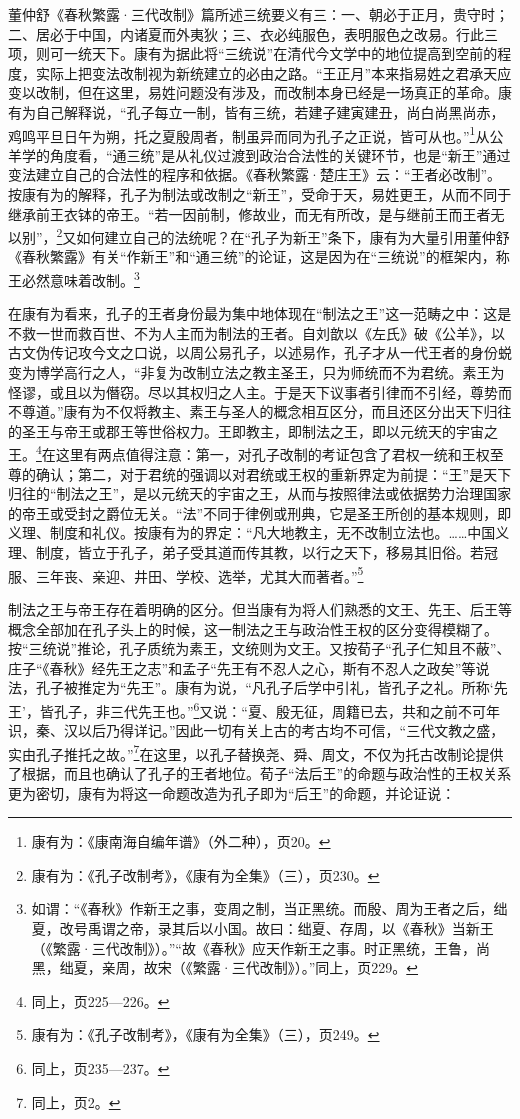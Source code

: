 \documentclass[a4paper, 12pt, openright]{ctexbook}
\begin{document}
董仲舒《春秋繁露·三代改制》篇所述三统要义有三：一、朝必于正月，贵守时；二、居必于中国，内诸夏而外夷狄；三、衣必纯服色，表明服色之改易。行此三项，则可一统天下。康有为据此将“三统说”在清代今文学中的地位提高到空前的程度，实际上把变法改制视为新统建立的必由之路。“王正月”本来指易姓之君承天应变以改制，但在这里，易姓问题没有涉及，而改制本身已经是一场真正的革命。康有为自己解释说，“孔子每立一制，皆有三统，若建子建寅建丑，尚白尚黑尚赤，鸡鸣平旦日午为朔，托之夏殷周者，制虽异而同为孔子之正说，皆可从也。”\footnote{康有为：《康南海自编年谱》（外二种），页20。}从公羊学的角度看，“通三统”是从礼仪过渡到政治合法性的关键环节，也是“新王”通过变法建立自己的合法性的程序和依据。《春秋繁露·楚庄王》云：“王者必改制”。按康有为的解释，孔子为制法或改制之“新王”，受命于天，易姓更王，从而不同于继承前王衣钵的帝王。“若一因前制，修故业，而无有所改，是与继前王而王者无以别”，\footnote{康有为：《孔子改制考》，《康有为全集》（三），页230。}又如何建立自己的法统呢？在“孔子为新王”条下，康有为大量引用董仲舒《春秋繁露》有关“作新王”和“通三统”的论证，这是因为在“三统说”的框架内，称王必然意味着改制。\footnote{如谓：“《春秋》作新王之事，变周之制，当正黑统。而殷、周为王者之后，绌夏，改号禹谓之帝，录其后以小国。故曰：绌夏、存周，以《春秋》当新王（《繁露·三代改制》）。”“故《春秋》应天作新王之事。时正黑统，王鲁，尚黑，绌夏，亲周，故宋（《繁露·三代改制》）。”同上，页229。}

在康有为看来，孔子的王者身份最为集中地体现在“制法之王”这一范畴之中：这是不救一世而救百世、不为人主而为制法的王者。自刘歆以《左氏》破《公羊》，以古文伪传记攻今文之口说，以周公易孔子，以述易作，孔子才从一代王者的身份蜕变为博学高行之人，“非复为改制立法之教主圣王，只为师统而不为君统。素王为怪谬，或且以为僭窃。尽以其权归之人主。于是天下议事者引律而不引经，尊势而不尊道。”康有为不仅将教主、素王与圣人的概念相互区分，而且还区分出天下归往的圣王与帝王或郡王等世俗权力。王即教主，即制法之王，即以元统天的宇宙之王。\footnote{同上，页225—226。}在这里有两点值得注意：第一，对孔子改制的考证包含了君权一统和王权至尊的确认；第二，对于君统的强调以对君统或王权的重新界定为前提：“王”是天下归往的“制法之王”，是以元统天的宇宙之王，从而与按照律法或依据势力治理国家的帝王或受封之爵位无关。“法”不同于律例或刑典，它是圣王所创的基本规则，即义理、制度和礼仪。按康有为的界定：“凡大地教主，无不改制立法也。……中国义理、制度，皆立于孔子，弟子受其道而传其教，以行之天下，移易其旧俗。若冠服、三年丧、亲迎、井田、学校、选举，尤其大而著者。”\footnote{康有为：《孔子改制考》，《康有为全集》（三），页249。}

制法之王与帝王存在着明确的区分。但当康有为将人们熟悉的文王、先王、后王等概念全部加在孔子头上的时候，这一制法之王与政治性王权的区分变得模糊了。按“三统说”推论，孔子质统为素王，文统则为文王。又按荀子“孔子仁知且不蔽”、庄子“《春秋》经先王之志”和孟子“先王有不忍人之心，斯有不忍人之政矣”等说法，孔子被推定为“先王”。康有为说，“凡孔子后学中引礼，皆孔子之礼。所称‘先王’，皆孔子，非三代先王也。”\footnote{同上，页235—237。}又说：“夏、殷无征，周籍已去，共和之前不可年识，秦、汉以后乃得详记。”因此一切有关上古的考古均不可信，“三代文教之盛，实由孔子推托之故。”\footnote{同上，页2。}在这里，以孔子替换尧、舜、周文，不仅为托古改制论提供了根据，而且也确认了孔子的王者地位。荀子“法后王”的命题与政治性的王权关系更为密切，康有为将这一命题改造为孔子即为“后王”的命题，并论证说：
\end{document}

